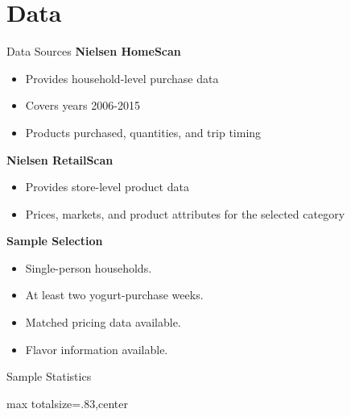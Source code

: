 \documentclass[aspectratio=169,professionalfonts]{beamer}
\newcommand{\shortbuttons}{}
\begin{document}
\section{Data}

\gdef\shortbuttons{\hyperlink{short-22}{\beamergotobutton{Activity}}}
\begin{frame}[label=short-21]{Data Sources}
  \textbf{Nielsen HomeScan}
  \begin{itemize}
    \item Provides household-level purchase data
    \item Covers years 2006-2015
    \item Products purchased, quantities, and trip timing
  \end{itemize}
  \textbf{Nielsen RetailScan}
  \begin{itemize}
    \item Provides store-level product data
    \item Prices, markets, and product attributes for the selected category
  \end{itemize}
  \textbf{Sample Selection}
  \begin{itemize}
    \item Single-person households.
    \item At least two yogurt-purchase weeks.
    \item Matched pricing data available.
    \item Flavor information available.
  \end{itemize}
\end{frame}


\gdef\shortbuttons{}
\begin{frame}[label=short-23]{Sample Statistics}
  \centering
  \begin{adjustbox}{max totalsize={\textwidth}{.83\textheight},center}
    \begin{minipage}{\textwidth}
      
    \end{minipage}
  \end{adjustbox}
\end{frame}
\end{document}
